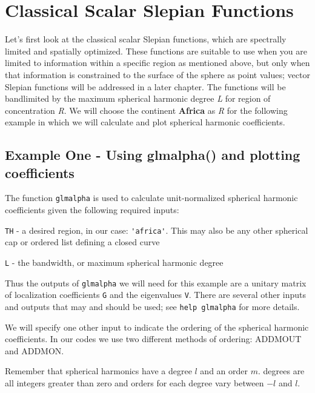 \documentclass[11pt]{article}
\begin{document}
\section{Classical Scalar Slepian Functions}
%
Let's first look at the classical scalar Slepian functions, which are spectrally limited and spatially optimized. These functions are suitable to use when you are limited to information within a specific region as mentioned above, but only when that information is constrained to the surface of the sphere as point values; vector Slepian functions will be addressed in a later chapter. The functions will be bandlimited by the maximum spherical harmonic degree \textit{L} for region of concentration \textit{R}. We will choose the continent \textbf{Africa} as \textit{R} for the following example in which we will calculate and plot spherical harmonic coefficients. 

\subsection{Example One - Using glmalpha() and plotting coefficients}

The function \verb+glmalpha+ is used to calculate unit-normalized spherical harmonic coefficients given the following required inputs:

\verb+TH+ - a desired region, in our case: \verb+'africa'+. This may also be any other spherical cap or ordered list defining a closed curve

\verb+L+ - the bandwidth, or maximum spherical harmonic degree

Thus the outputs of \verb+glmalpha+ we will need for this example are a unitary matrix of localization coefficients \verb+G+ and the eigenvalues \verb+V+. There are several other inputs and outputs that may and should be used; see \verb+help glmalpha+ for more details. 

We will specify one other input to indicate the ordering of the spherical harmonic coefficients. In our codes  we use two different methods of ordering: ADDMOUT and ADDMON. 

Remember that spherical harmonics have a degree $l$ and an order $m$. degrees are all integers greater than zero and orders for each degree vary between $-l$ and $l$.
\end{document}
